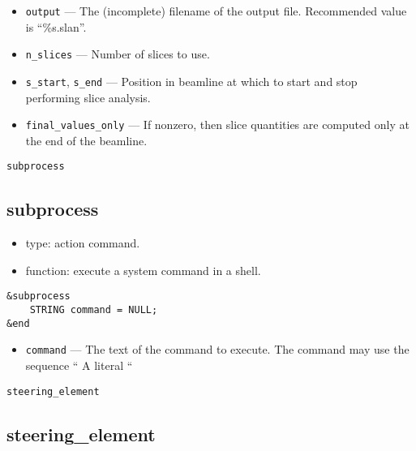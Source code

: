 \documentclass[11pt]{article}
\begin{document}
\begin{itemize}
\item \verb|output| --- The (incomplete) filename of the output file.
	Recommended value is ``\%s.slan''.
\item \verb|n_slices| --- Number of slices to use.
\item \verb|s_start|, \verb|s_end| --- Position in beamline at which to start
        and stop performing slice analysis.
\item \verb|final_values_only| --- If nonzero, then slice quantities are computed
        only at the end of the beamline.
\end{itemize}

\begin{latexonly}
\newpage
\begin{center}{\Large\verb|subprocess|}\end{center}
\end{latexonly}
\subsection{subprocess \label{subsec:subprocess}}

\begin{itemize}
\item type: action command.
\item function: execute a system command in a shell.
\end{itemize}

\begin{verbatim}
&subprocess 
    STRING command = NULL;
&end
\end{verbatim}

\begin{itemize}
\item \verb|command| --- The text of the command to execute.  The command may
use the sequence ``%
A literal ``%
\end{itemize}

\begin{latexonly}
\newpage
\begin{center}{\Large\verb|steering_element|}\end{center}
\end{latexonly}
\subsection{steering\_element \label{subsec:steeringelement}}
\end{document}
